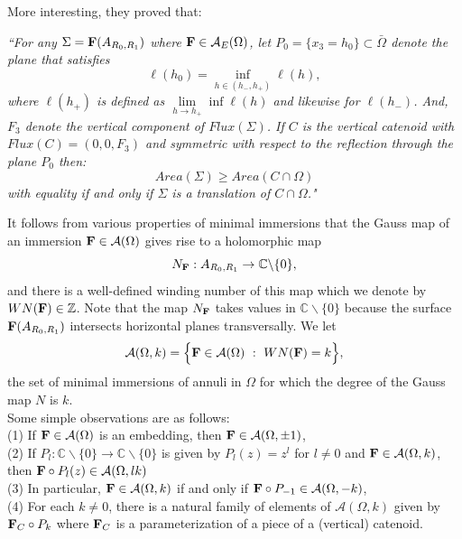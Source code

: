 \documentclass[11pt]{amsart}
\numberwithin{equation}{section}
\theoremstyle{theorem}
\theoremstyle{definition}
\numberwithin{equation}{section}
\begin{document}
More interesting, they proved that: 
\medskip

\textit{``For any $\Sigma = \bold{F}(A_{R_0,R_1})$ where $\bold{F} \in \mathcal{A}_E(\Omega)$, let $P_0=\{x_3=h_0\}\subset \bar{\Omega}$ denote the plane that satisfies 
$$
\ell(h_0)=\underset{h\in (h_-,h_+)}{\inf}  \ell(h),
$$
where $\ell(h_+)$ is defined as $\underset{h\rightarrow h_+}{\lim} \inf \ell (h)$ and likewise for $\ell(h_-)$.
And, $F_3$ denote the vertical component of $Flux (\Sigma)$. If $C$ is the vertical catenoid with $Flux(C)=(0,0,F_3)$ and symmetric with respect to the reflection through the plane $P_0$ then:
$$
Area (\Sigma) \geq Area (C\cap \Omega)
$$
with equality if and only if $\Sigma$ is a translation of $C\cap \Omega$."}
\medskip


It follows from various properties of minimal immersions that the Gauss map of an immersion $\bold{F} \in \mathcal{A}(\Omega)$ gives rise to a holomorphic map
\begin{equation}
    \nonumber
    N_{\bold{F}} : A_{R_0,R_1} \rightarrow \mathbb{C} \backslash \{0\},
\end{equation}
and there is a well-defined winding number of this map which we denote by $WN(\bold{F}) \in \mathbb{Z}$. Note that the map $N_{\bold{F}}$ takes values
in $\mathbb{C} \backslash \{0\}$ because the surface $\bold{F}(A_{R_0,R_{1}})$ intersects horizontal planes
transversally.
We let
\begin{equation}  
\nonumber
\mathcal{A}(\Omega , k) = \Big\{ \bold{F} \in \mathcal{A} (\Omega)\ :\ WN(\bold{F}) = k \Big\},
\end{equation}
the set of minimal immersions of annuli in $\Omega$ for which the degree of the Gauss map $N$ is $k$. \\
Some simple observations are as follows: \\
(1) If $\bold{F} \in \mathcal{A}(\Omega)$ is an embedding, then $\bold{F} \in \mathcal{A}(\Omega ,\pm 1)$,\\
(2) If $P_l : \mathbb{C} \backslash \{0\} \rightarrow \mathbb{C} \backslash \{0\}$ is given by $P_l(z)=z^l$ for $l\neq 0$ and $\bold{F} \in \mathcal{A}(\Omega ,k)$, then $\bold{F} \circ P_l(z) \in \mathcal{A}(\Omega ,lk)$\\
(3) In particular, $\bold{F} \in \mathcal{A}(\Omega ,k)$ if and only if $\bold{F} \circ P_{-1} \in \mathcal{A}(\Omega ,-k)$,\\
(4) For each $k\neq 0$, there is a natural family of elements of $\mathcal{A}(\Omega ,k)$ given by $\bold{F}_C \circ P_k$ where $\bold{F}_C$ is a parameterization of a piece of a (vertical) catenoid.
\medskip
\end{document}
